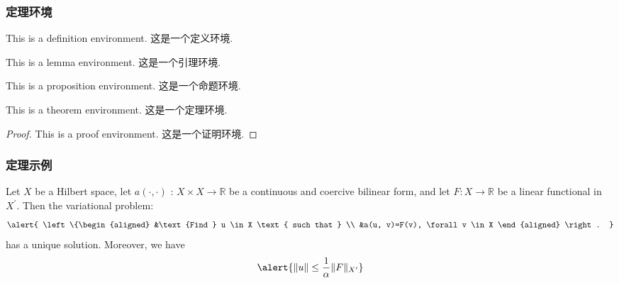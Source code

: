 \begin{frame}
\frametitle{定理环境}

\begin{definition} \upshape
This is a definition environment. 这是一个定义环境.
\end{definition}


\begin{lemma} \upshape
This is a lemma environment. 这是一个引理环境.
\end{lemma}

\begin{proposition} \upshape
This is a proposition environment. 这是一个命题环境.
\end{proposition}

\begin{theorem} \upshape
This is a theorem environment. 这是一个定理环境.
\end{theorem}

\begin{proof}
    This is a proof environment. 这是一个证明环境.
\end{proof}

\end{frame}


\begin{frame}
\frametitle{定理示例}

\begin{theorem} \upshape
Let $X$ be a Hilbert space, let $a(\cdot, \cdot)$ : $X \times X \rightarrow \mathbb{R}$ be a continuous and coercive bilinear form, and let $F : X \rightarrow \mathbb{R}$ be a linear functional in $X^{\prime}$. Then the variational problem:
\begin{equation}
    \alert{
    \left\{\begin{aligned}
    &\text {Find } u \in X \text { such that } \\
    &a(u, v)=F(v), \forall v \in X
    \end{aligned} \right. }
\end{equation}
has a unique solution. Moreover, we have
\begin{equation}
    \alert{ \|u\| \leq \frac{1}{\alpha}\|F\|_{X^{\prime}}  }
\end{equation}
\end{theorem}

\end{frame}

